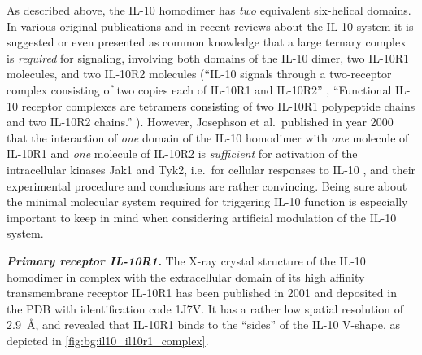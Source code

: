 As described above, the IL-10 homodimer has \textit{two} equivalent six-helical
domains. In various original publications and in recent reviews about the IL-10
system it is suggested or even presented as common knowledge that a large
ternary complex is \textit{required} for signaling, involving both domains of
the IL-10 dimer, two IL-10R1 molecules, and two IL-10R2 molecules
(\enquote{IL-10 signals through a two-receptor complex consisting of two copies
each of IL-10R1 and IL-10R2} \cite{mosser_il10_newperspectives_2008},
\enquote{Functional IL-10 receptor complexes are tetramers consisting
of two IL-10R1 polypeptide chains and two IL-10R2 chains.}
\cite{donnelly_finbloom_il10_1999}). However, Josephson et al.\ published in
year 2000 that the interaction of \textit{one} domain of the IL-10 homodimer
with \textit{one} molecule of IL-10R1 and \textit{one} molecule of IL-10R2 is
\textit{sufficient} for activation of the intracellular kinases Jak1 and Tyk2,
i.e.\ for cellular responses to IL-10 \cite{il10_monomer_2000}, and their
experimental procedure and conclusions are rather convincing. Being sure about
the minimal molecular system required for triggering IL-10 function is
especially important to keep in mind when considering artificial modulation of
the IL-10 system.

\vspace{0.5cm}
\textit{\textbf{Primary receptor IL-10R1.}} The X-ray crystal structure of the
IL-10 homodimer in complex with the extracellular domain of its high affinity
transmembrane receptor IL-10R1 has been published in 2001 \cite{Josephson2001}
and deposited in the PDB with identification code 1J7V. It has a rather low
spatial resolution of \SI{2.9}{\angstrom}, and revealed that IL-10R1 binds to
the \enquote{sides} of the IL-10 V-shape, as depicted in
\cref{fig:bg:il10_il10r1_complex}.

